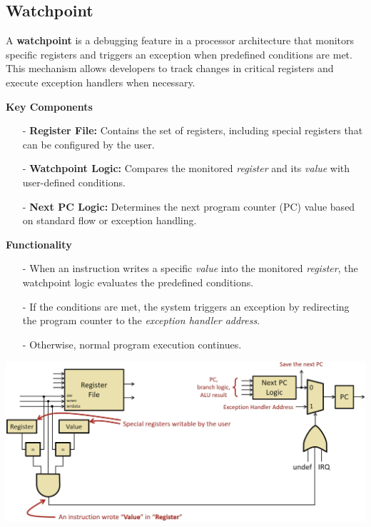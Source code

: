 \subsection{Watchpoint}
A \textbf{watchpoint} is a debugging feature in a processor architecture that monitors specific registers and triggers an exception when predefined conditions are met. This mechanism allows developers to track changes in critical registers and execute exception handlers when necessary. \\
\begin{minipage}[htp]{0.45\textwidth}
\small
\textbf{Key Components}
\begin{itemize}
    \item[-] \textbf{Register File:} Contains the set of registers, including special registers that can be configured by the user.
    \item[-] \textbf{Watchpoint Logic:} Compares the monitored \textit{register} and its \textit{value} with user-defined conditions.
    \item[-] \textbf{Next PC Logic:} Determines the next program counter (PC) value based on standard flow or exception handling.
\end{itemize}
\textbf{Functionality}
\begin{itemize}
    \item[-] When an instruction writes a specific \textit{value} into the monitored \textit{register}, the watchpoint logic evaluates the predefined conditions.
    \item[-] If the conditions are met, the system triggers an exception by redirecting the program counter to the \textit{exception handler address}.
    \item[-] Otherwise, normal program execution continues.
\end{itemize}
\end{minipage}
\hfill
\vline
\hfill
\begin{minipage}[htp]{0.45\textwidth}
\begin{center}
    \includegraphics[width=1.1\textwidth]{chapters/chapter2d/images/watchpoint.png}
\end{center}
\end{minipage}

